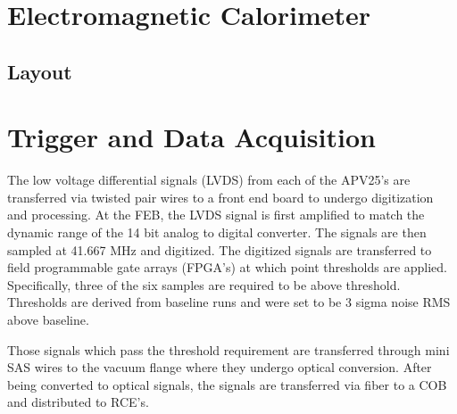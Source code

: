 \section{Electromagnetic Calorimeter}

\subsection{Layout}

\section{Trigger and Data Acquisition}

The low voltage differential signals (LVDS) from each of the APV25's are 
transferred via twisted pair wires to a front end board to undergo digitization
and processing.  At the FEB, the LVDS signal is first amplified to match the 
dynamic range of the 14 bit analog to digital converter.  The signals are then
sampled at 41.667 MHz and digitized.  The digitized signals are transferred to 
 field programmable gate arrays (FPGA's) at which point thresholds are applied.
 Specifically, three of the six samples are required to be above threshold.  
 Thresholds are derived from baseline runs and were set to be 3 sigma noise RMS
 above baseline.

 Those signals which pass the threshold requirement are transferred through 
 mini SAS wires to the vacuum flange where they undergo optical conversion.
 After being converted to optical signals, the signals are transferred via 
 fiber to a COB and distributed to RCE's.



